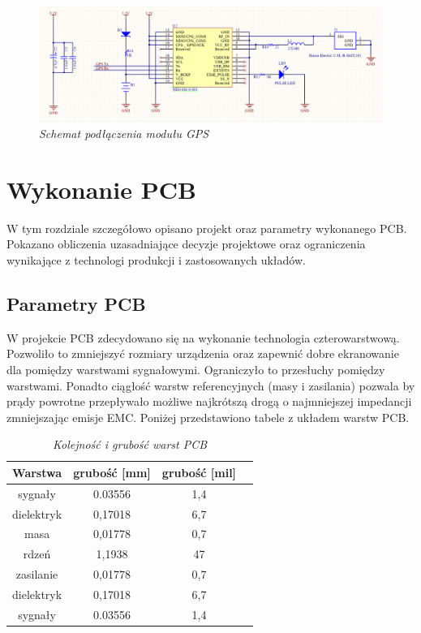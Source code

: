 \documentclass[eng,printmode]{mgr}
\begin{document}
\begin{figure}[!h]
    \centering
    \includegraphics[width=\textwidth]{schematics/gps.png}
    \caption{\textit{ Schemat podłączenia modułu GPS}}
\end{figure}
\newpage

\section{ Wykonanie PCB }
W tym rozdziale szczegółowo opisano projekt oraz parametry wykonanego PCB. Pokazano obliczenia uzasadniające decyzje projektowe oraz ograniczenia wynikające z technologi produkcji i zastosowanych układów. 

\subsection{Parametry PCB} \label{pcbSection}
W projekcie PCB zdecydowano się na wykonanie technologia czterowarstwową. Pozwoliło to zmniejszyć rozmiary urządzenia oraz zapewnić dobre ekranowanie dla pomiędzy warstwami sygnałowymi. Ograniczyło to przesłuchy pomiędzy warstwami. Ponadto ciągłość warstw referencyjnych (masy i zasilania) pozwala by prądy powrotne przepływało możliwe najkrótszą drogą o najmniejszej impedancji zmniejszając emisje EMC. Poniżej przedstawiono tabele z układem warstw PCB.

\begin{table}[htb]

\caption{\textit{ Kolejność i grubość warst PCB}}
\label{tab:pcbStack}
\begin{center}
\begin{tabular}{ |c|c|c|c| }
\hline
Warstwa& grubość [mm] & grubość [mil] \\ 
\hline
sygnały & 0.03556 & 1,4 \\ 
\hline
dielektryk & 0,17018 & 6,7\\ 
\hline
masa & 0,01778 & 0,7\\ 
\hline
rdzeń & 1,1938 & 47\\ 
\hline
zasilanie & 0,01778 & 0,7\\ 
\hline
dielektryk & 0,17018 & 6,7\\ 
\hline
sygnały & 0.03556 & 1,4 \\ 
\hline
\end{tabular}
\end{center}
\end{table}
\end{document}
